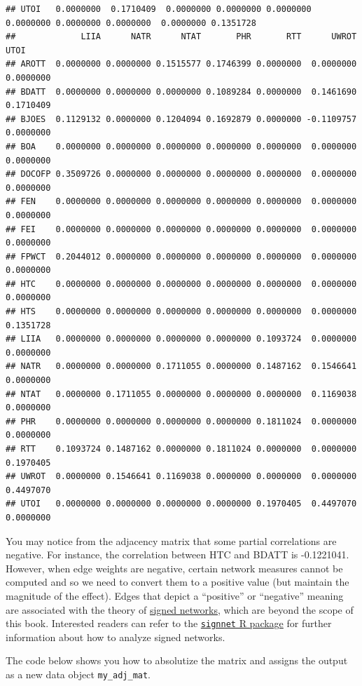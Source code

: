 \documentclass[
]{book}
\begin{document}
\begin{verbatim}
## UTOI   0.0000000  0.1710409  0.0000000 0.0000000 0.0000000 0.0000000 0.0000000 0.0000000  0.0000000 0.1351728
##             LIIA      NATR      NTAT       PHR       RTT      UWROT      UTOI
## AROTT  0.0000000 0.0000000 0.1515577 0.1746399 0.0000000  0.0000000 0.0000000
## BDATT  0.0000000 0.0000000 0.0000000 0.1089284 0.0000000  0.1461690 0.1710409
## BJOES  0.1129132 0.0000000 0.1204094 0.1692879 0.0000000 -0.1109757 0.0000000
## BOA    0.0000000 0.0000000 0.0000000 0.0000000 0.0000000  0.0000000 0.0000000
## DOCOFP 0.3509726 0.0000000 0.0000000 0.0000000 0.0000000  0.0000000 0.0000000
## FEN    0.0000000 0.0000000 0.0000000 0.0000000 0.0000000  0.0000000 0.0000000
## FEI    0.0000000 0.0000000 0.0000000 0.0000000 0.0000000  0.0000000 0.0000000
## FPWCT  0.2044012 0.0000000 0.0000000 0.0000000 0.0000000  0.0000000 0.0000000
## HTC    0.0000000 0.0000000 0.0000000 0.0000000 0.0000000  0.0000000 0.0000000
## HTS    0.0000000 0.0000000 0.0000000 0.0000000 0.0000000  0.0000000 0.1351728
## LIIA   0.0000000 0.0000000 0.0000000 0.0000000 0.1093724  0.0000000 0.0000000
## NATR   0.0000000 0.0000000 0.1711055 0.0000000 0.1487162  0.1546641 0.0000000
## NTAT   0.0000000 0.1711055 0.0000000 0.0000000 0.0000000  0.1169038 0.0000000
## PHR    0.0000000 0.0000000 0.0000000 0.0000000 0.1811024  0.0000000 0.0000000
## RTT    0.1093724 0.1487162 0.0000000 0.1811024 0.0000000  0.0000000 0.1970405
## UWROT  0.0000000 0.1546641 0.1169038 0.0000000 0.0000000  0.0000000 0.4497070
## UTOI   0.0000000 0.0000000 0.0000000 0.0000000 0.1970405  0.4497070 0.0000000
\end{verbatim}

You may notice from the adjacency matrix that some partial correlations are negative. For instance, the correlation between HTC and BDATT is -0.1221041. However, when edge weights are negative, certain network measures cannot be computed and so we need to convert them to a positive value (but maintain the magnitude of the effect). Edges that depict a ``positive'' or ``negative'' meaning are associated with the theory of \href{https://en.wikipedia.org/wiki/Signed_network}{signed networks}, which are beyond the scope of this book. Interested readers can refer to the \href{https://www.r-bloggers.com/2020/01/a-package-for-analysing-signed-networks/}{\texttt{signnet} R package} for further information about how to analyze signed networks.

The code below shows you how to absolutize the matrix and assigns the output as a new data object \texttt{my\_adj\_mat}.
\end{document}
